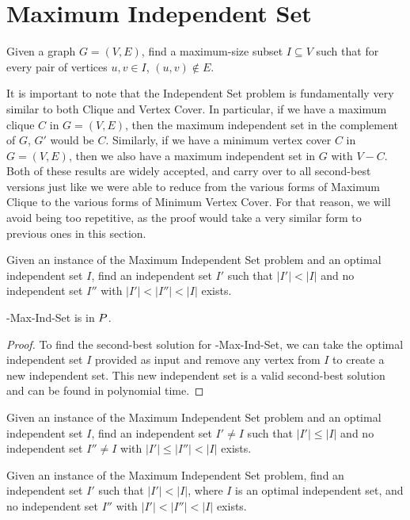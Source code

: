 \section{Maximum Independent Set}
\begin{definition}
Given a graph $G = (V, E)$, find a maximum-size subset
$I \subseteq V$ such that for every pair of vertices $u, v \in I$, $(u, v) \notin E$.
\end{definition}
It is important to note that the Independent Set problem is fundamentally very similar to both Clique and Vertex Cover. In particular, if we have a maximum clique $C$ in $G = (V,E)$, then the maximum independent set in the complement of $G$, $G'$ would be $C$. Similarly, if we have a minimum vertex cover $C$ in $G= (V,E)$, then we also have a maximum independent set in $G$ with $V-C$. Both of these results are widely accepted, and carry over to all second-best versions just like we were able to reduce from the various forms of Maximum Clique to the various forms of Minimum Vertex Cover. For that reason, we will avoid being too repetitive, as the proof would take a very similar form to previous ones in this section.
\begin{definition}
Given an instance of the Maximum Independent Set problem and an optimal independent set $I$, find an independent set $I'$ such that $|I'| < |I|$ and no independent set $I''$ with $|I'| < |I''| < |I|$ exists.
\end{definition}

\begin{theorem}
\exob{}-Max-Ind-Set is in ${P}{}$.
\end{theorem}
\begin{proof}
To find the second-best solution for \exob{}-Max-Ind-Set, we can take the optimal independent set $I$ provided as input and remove any vertex from $I$ to create a new independent set. This new independent set is a valid second-best solution and can be found in polynomial time.
\end{proof}

\begin{definition}
Given an instance of the Maximum Independent Set problem and an optimal independent set $I$, find an independent set $I' \neq I$ such that $|I'| \leq |I|$ and no independent set $I'' \neq I$ with $|I'| \leq |I''| < |I|$ exists.
\end{definition}

\begin{definition}
Given an instance of the Maximum Independent Set problem, find an independent set $I'$ such that $|I'| < |I|$, where $I$ is an optimal independent set, and no independent set $I''$ with $|I'| < |I''| < |I|$ exists.
\end{definition}


